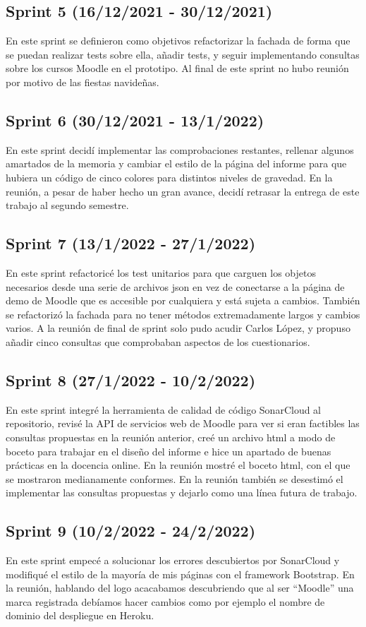 \subsection{Sprint 5 (16/12/2021 - 30/12/2021)}
	En este sprint se definieron como objetivos refactorizar la fachada de forma que se puedan realizar tests sobre ella, añadir tests, y seguir implementando consultas sobre los cursos Moodle en el prototipo. Al final de este sprint no hubo reunión por motivo de las fiestas navideñas.
\subsection{Sprint 6 (30/12/2021 - 13/1/2022)}
	En este sprint decidí implementar las comprobaciones restantes, rellenar algunos amartados de la memoria y cambiar el estilo de la página del informe para que hubiera un código de cinco colores para distintos niveles de gravedad. En la reunión, a pesar de haber hecho un gran avance, decidí retrasar la entrega de este trabajo al segundo semestre.
\subsection{Sprint 7 (13/1/2022 - 27/1/2022)}
	En este sprint refactoricé los test unitarios para que carguen los objetos necesarios desde una serie de archivos json en vez de conectarse a la página de demo de Moodle que es accesible por cualquiera y está sujeta a cambios. También se refactorizó la fachada para no tener métodos extremadamente largos y cambios varios. A la reunión de final de sprint solo pudo acudir Carlos López, y propuso añadir cinco consultas que comprobaban aspectos de los cuestionarios.
\subsection{Sprint 8 (27/1/2022 - 10/2/2022)}
	En este sprint integré la herramienta de calidad de código SonarCloud al repositorio, revisé la API de servicios web de Moodle para ver si eran factibles las consultas propuestas en la reunión anterior, creé un archivo html a modo de boceto para trabajar en el diseño del informe e hice un apartado de buenas prácticas en la docencia online. En la reunión mostré el boceto html, con el que se mostraron medianamente conformes. En la reunión también se desestimó el implementar las consultas propuestas y dejarlo como una línea futura de trabajo.
\subsection{Sprint 9 (10/2/2022 - 24/2/2022)}
	En este sprint empecé a solucionar los errores descubiertos por SonarCloud y modifiqué el estilo de la mayoría de mis páginas con el framework Bootstrap. En la reunión, hablando del logo acacabamos descubriendo que al ser ``Moodle'' una marca registrada debíamos hacer cambios como por ejemplo el nombre de dominio del despliegue en Heroku.
